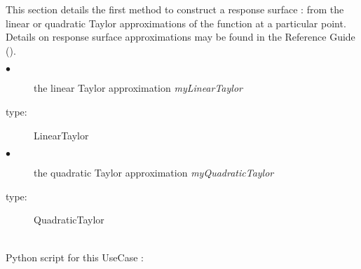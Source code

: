 \renewcommand{\filename}{docUC_RespSurface_TaylorApprox.tex}
\renewcommand{\filetitle}{UC : Linear and Quadratic Taylor approximations}

\HeaderIIILevel

\label{taylorApprox}


This section details the first method to construct a response surface : from the linear or quadratic Taylor approximations of the function at a particular point.\\

Details on response surface approximations may be found in the Reference Guide ().\\


             {
               \begin{description}
               \item[$\bullet$] the linear Taylor approximation {\itshape myLinearTaylor}
               \item[type:]  LinearTaylor
               \item[$\bullet$] the quadratic Taylor approximation {\itshape myQuadraticTaylor}
               \item[type:]  QuadraticTaylor
               \end{description}
             }

             \textspace\\
             Python  script for this UseCase :

